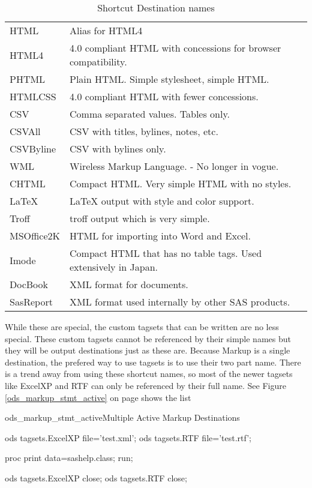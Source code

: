 \begin{table}\caption{Shortcut Destination names}
\label{shortcut_destinations}
\begin{tabular}{l|l}
\hline
HTML &  Alias for HTML4 \\
HTML4 & 4.0 compliant HTML with concessions for browser compatibility. \\
PHTML & Plain HTML.  Simple stylesheet, simple HTML. \\
HTMLCSS & 4.0 compliant HTML with fewer concessions. \\
CSV &  Comma separated values.  Tables only. \\
CSVAll & CSV with titles, bylines, notes, etc. \\
CSVByline & CSV with bylines only. \\
WML &  Wireless Markup Language. - No longer in vogue. \\
CHTML & Compact HTML. Very simple HTML with no styles. \\
LaTeX & LaTeX output with style and color support. \\
Troff & troff output which is very simple. \\
MSOffice2K & HTML for importing into Word and Excel. \\
Imode & Compact HTML that has no table tags.  Used extensively in Japan. \\
DocBook &  XML format for documents. \\
SasReport & XML format used internally by other SAS products.
\end{tabular}
\end{table}

While these are special, the custom tagsets that can be written are no less special.  These
custom tagsets cannot be referenced by their simple names but they will be output destinations just
as these are.  Because Markup is a single destination, the prefered way to use tagsets is to
use their two part name.  There is a trend away from using these shortcut names, so most of the
newer tagsets like ExcelXP and RTF can only be referenced by their full name.
See Figure \ref{ods_markup_stmt_active} on page \pageref{ods_markup_stmt_active} shows the list

\begin{fvcode}{ods_markup_stmt_active}{Multiple Active Markup Destinations}

    ods tagsets.ExcelXP file='test.xml';
    ods tagsets.RTF file='test.rtf';

    proc print data=sashelp.class; 
    run;

    ods tagsets.ExcelXP close;
    ods tagsets.RTF close;

\end{fvcode}
     
